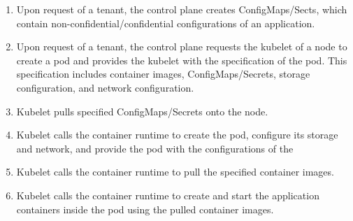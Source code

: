 \begin{enumerate}
  \item Upon request of a tenant, the control plane creates ConfigMaps/Sects,
        which contain non-confidential/confidential configurations of an
        application.
  \item Upon request of a tenant, the control plane requests the kubelet of a
        node to create a pod and provides the kubelet with the specification of
        the pod. This specification includes container images,
        ConfigMaps/Secrets, storage configuration, and network configuration.
  \item Kubelet pulls specified ConfigMaps/Secrets onto the node.
  \item Kubelet calls the container runtime to create the pod, configure its
        storage and network, and provide the pod with the configurations of the
  \item Kubelet calls the container runtime to pull the specified container
        images.
  \item Kubelet calls the container runtime to create and start the application
        containers inside the pod using the pulled container images.
\end{enumerate}
